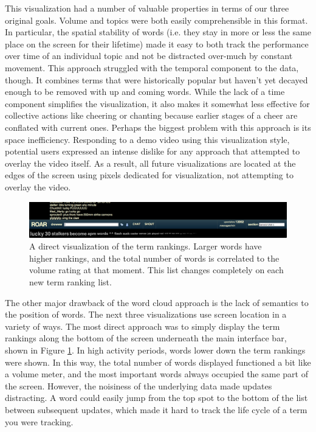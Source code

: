 This visualization had a number of valuable properties in terms of our three original goals. Volume and topics were both easily comprehensible in this format. In particular, the spatial stability of words (i.e. they stay in more or less the same place on the screen for their lifetime) made it easy to both track the performance over time of an individual topic and not be distracted over-much by constant movement. This approach struggled with the temporal component to the data, though. It combines terms that were historically popular but haven't yet decayed enough to be removed with up and coming words. While the lack of a time component simplifies the visualization, it also makes it somewhat less effective for collective actions like cheering or chanting because earlier stages of a cheer are conflated with current ones. Perhaps the biggest problem with this approach is its space inefficiency. Responding to a demo video using this visualization style, potential users expressed an intense dislike for any approach that attempted to overlay the video itself. As a result, all future visualizations are located at the edges of the screen using pixels dedicated for visualization, not attempting to overlay the video.

\begin{figure}[tb]
	\includegraphics{figures/roar/bar.png}
	\caption{A direct visualization of the term rankings. Larger words have higher rankings, and the total number of words is correlated to the volume rating at that moment. This list changes completely on each new term ranking list.}
	\label{fig:pulse_rankings}
\end{figure}

The other major drawback of the word cloud approach is the lack of semantics to the position of words. The next three visualizations use screen location in a variety of ways. The most direct approach was to simply display the term rankings along the bottom of the screen underneath the main interface bar, shown in Figure \ref{fig:pulse_rankings}. In high activity periods, words lower down the term rankings were shown. In this way, the total number of words displayed functioned a bit like a volume meter, and the most important words always occupied the same part of the screen. However, the noisiness of the underlying data made updates distracting. A word could easily jump from the top spot to the bottom of the list between subsequent updates, which made it hard to track the life cycle of a term you were tracking. 

